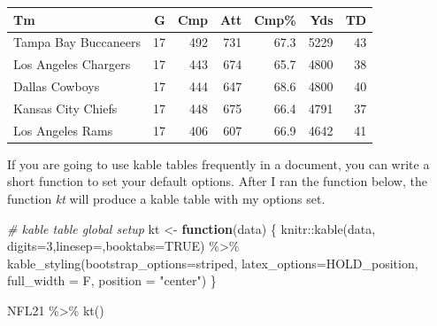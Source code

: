 \documentclass[
  11pt,
]{book}
\newenvironment{Shaded}{\begin{snugshade}}{\end{snugshade}}
\newcommand{\AttributeTok}[1]{\textcolor[rgb]{0.77,0.63,0.00}{#1}}
\newcommand{\CommentTok}[1]{\textcolor[rgb]{0.56,0.35,0.01}{\textit{#1}}}
\newcommand{\ConstantTok}[1]{\textcolor[rgb]{0.00,0.00,0.00}{#1}}
\newcommand{\ControlFlowTok}[1]{\textcolor[rgb]{0.13,0.29,0.53}{\textbf{#1}}}
\newcommand{\DecValTok}[1]{\textcolor[rgb]{0.00,0.00,0.81}{#1}}
\newcommand{\FunctionTok}[1]{\textcolor[rgb]{0.00,0.00,0.00}{#1}}
\newcommand{\NormalTok}[1]{#1}
\newcommand{\OtherTok}[1]{\textcolor[rgb]{0.56,0.35,0.01}{#1}}
\newcommand{\SpecialCharTok}[1]{\textcolor[rgb]{0.00,0.00,0.00}{#1}}
\newcommand{\StringTok}[1]{\textcolor[rgb]{0.31,0.60,0.02}{#1}}
\theoremstyle{definition}
\theoremstyle{definition}
\theoremstyle{definition}
\theoremstyle{definition}
\theoremstyle{remark}
\begin{document}
\begin{table}[!h]
\centering
\begin{tabular}{lrrrrrr}
\toprule
Tm & G & Cmp & Att & Cmp\% & Yds & TD\\
\midrule
Tampa Bay Buccaneers & 17 & 492 & 731 & 67.3 & 5229 & 43\\
Los Angeles Chargers & 17 & 443 & 674 & 65.7 & 4800 & 38\\
Dallas Cowboys & 17 & 444 & 647 & 68.6 & 4800 & 40\\
Kansas City Chiefs & 17 & 448 & 675 & 66.4 & 4791 & 37\\
Los Angeles Rams & 17 & 406 & 607 & 66.9 & 4642 & 41\\
\bottomrule
\end{tabular}
\end{table}

\vfill
\newpage

If you are going to use kable tables frequently in a document, you can write a short function to set your default options. After I ran the function below, the function \emph{kt} will produce a kable table with my options set.

\begin{Shaded}
\begin{Highlighting}[]
\CommentTok{\# kable table global setup}
\NormalTok{kt }\OtherTok{\textless{}{-}} \ControlFlowTok{function}\NormalTok{(data) \{}
\NormalTok{  knitr}\SpecialCharTok{::}\FunctionTok{kable}\NormalTok{(data, }\AttributeTok{digits=}\DecValTok{3}\NormalTok{,}\AttributeTok{linesep=}\StringTok{\textquotesingle{}\textquotesingle{}}\NormalTok{,}\AttributeTok{booktabs=}\ConstantTok{TRUE}\NormalTok{) }\SpecialCharTok{\%\textgreater{}\%} \FunctionTok{kable\_styling}\NormalTok{(}\AttributeTok{bootstrap\_options=}\StringTok{\textquotesingle{}striped\textquotesingle{}}\NormalTok{, }\AttributeTok{latex\_options=}\StringTok{\textquotesingle{}HOLD\_position\textquotesingle{}}\NormalTok{, }\AttributeTok{full\_width =}\NormalTok{ F, }\AttributeTok{position =} \StringTok{"center"}\NormalTok{)}
\NormalTok{\}}
\end{Highlighting}
\end{Shaded}

\begin{Shaded}
\begin{Highlighting}[]
\NormalTok{NFL21 }\SpecialCharTok{\%\textgreater{}\%} \FunctionTok{kt}\NormalTok{()}
\end{Highlighting}
\end{Shaded}
\end{document}
